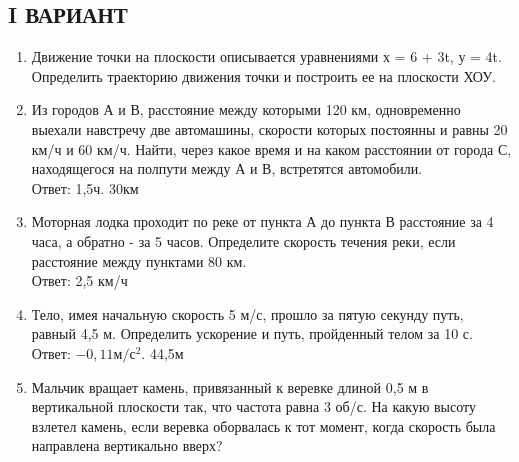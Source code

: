 \documentclass[a5paper, 10pt]{diss_4}
\renewcommand{\'}{\,'}
\begin{document}
\subsection{I ВАРИАНТ}
\begin{enumerate}
\item Движение точки на плоскости описывается уравнениями х = 6 + 3t, у = 4t. Определить траекторию движения точки и построить ее на плоскости ХОУ.
\item Из городов А и В, расстояние между которыми 120 км, одновременно выехали навстречу две автомашины, скорости которых постоянны и равны 20 км/ч и 60 км/ч. Найти, через какое время и на каком расстоянии от города С, находящегося на полпути между А и В, встретятся автомобили.
\\ Ответ: 1,5ч. 30км
\item Моторная лодка проходит по реке от пункта А до пункта В расстояние за 4 часа, а обратно - за 5 часов. Определите скорость течения реки, если расстояние между пунктами 80 км.
\\ Ответ: 2,5 км/ч
\item Тело, имея начальную скорость 5 м/с, прошло за пятую секунду путь, равный 4,5 м. Определить ускорение и путь, пройденный телом за 10 с.
\\ Ответ: $-0,11м/с^2$.  44,5м

\item Мальчик вращает камень, привязанный к веревке длиной 0,5 м в вертикальной плоскости так, что частота равна 3 об/с. На какую высоту взлетел камень, если веревка оборвалась к тот момент, когда скорость была направлена вертикально вверх?
\end{enumerate}
\end{document}
